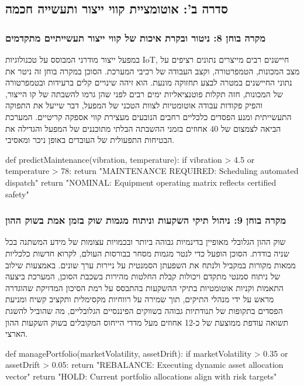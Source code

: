 \documentclass{hebrew-academic-template}
\begin{document}
\subsection{סדרה ב': אוטומציית קווי ייצור ותעשייה חכמה}

\subsubsection{מקרה בוחן 8: ניטור ובקרת איכות של קווי ייצור תעשייתיים מתקדמים}
במפעל ייצור מודרני המבוסס על טכנולוגיות IoT, חיישנים רבים מייצרים נתונים רציפים על מצב המכונות, הטמפרטורה, וקצב העבודה של רכיבי המערכת. הסוכן במקרה בוחן זה ניטר את נתוני החיישנים במטרה לבצע תחזוקה מונעת. הוא זיהה שינויים קלים ברעידות ובטמפרטורה של המכונות, חזה תקלות פוטנציאליות ימים רבים לפני שהן גרמו להשבתה של קו הייצור, והפיק פקודות עבודה אוטומטיות לצוות הטכני של המפעל, דבר שייעל את התפוקה התעשייתית ומנע הפסדים כלכליים רחבים הנובעים מעצירת קווי אספקה קריטיים. המערכת הביאה לצמצום של 40 אחוזים בזמני ההשבתה הבלתי מתוכננים של המפעל והגדילה את הבטיחות התפעולית של העובדים באופן ניכר ומאסיבי.
\begin{pythonbox}
def predictMaintenance(vibration, temperature):
    if vibration > 4.5 or temperature > 78:
        return "MAINTENANCE REQUIRED: Scheduling automated dispatch"
    return "NOMINAL: Equipment operating matrix reflects certified safety"
\end{pythonbox}

\subsubsection{מקרה בוחן 9: ניהול תיקי השקעות וניתוח מגמות שוק בזמן אמת בשוק ההון}
שוק ההון הגלובלי מאופיין בדינמיות גבוהה ביותר ובכמויות עצומות של מידע המשתנה בכל שניה בודדת. הסוכן הופעל כדי לנטר מגמות מסחר בבורסות העולם, לקרוא חדשות כלכליות ממאות מקורות במקביל ולנתח את השפעתן הסמנטית על ניירות ערך שונים. באמצעות שילוב של ניתוח סמנטי מתקדם ויכולות קבלת החלטות מהירות בשכבת הסוכן, המערכת ביצעה התאמות וקניות אוטומטיות בתיקי ההשקעות בהתבסס על רמת הסיכון המדויקת שהוגדרה מראש על ידי מנהלי התיקים, תוך שמירה על רווחיות מקסימלית ותקציב קשיח ומניעת הפסדים בתקופות של תנודתיות גבוהה בשווקים הפיננסיים הגלובליים, מה שהוביל להשגת תשואה עודפת ממוצעת של כ-12 אחוזים מעל מדדי הייחוס המקובלים בשוק השקעות ההון הארצי.
\begin{pythonbox}
def managePortfolio(marketVolatility, assetDrift):
    if marketVolatility > 0.35 or assetDrift > 0.05:
        return "REBALANCE: Executing dynamic asset allocation vector"
    return "HOLD: Current portfolio allocations align with risk targets"
\end{pythonbox}
\end{document}
